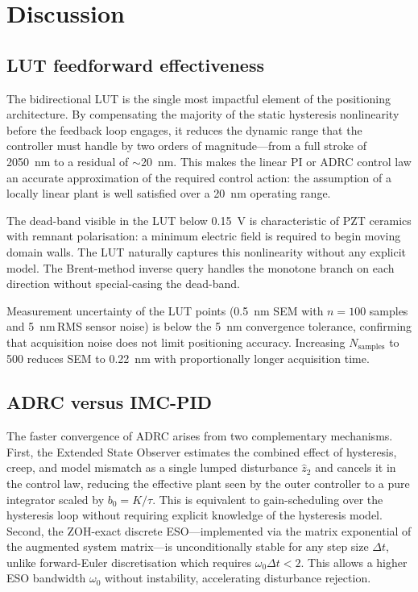 \documentclass[fleqn,10pt]{wlscirep}
\begin{document}
\section*{Discussion}

\subsection*{LUT feedforward effectiveness}

The bidirectional LUT is the single most impactful element of the positioning architecture. By compensating the majority of the static hysteresis nonlinearity before the feedback loop engages, it reduces the dynamic range that the controller must handle by two orders of magnitude---from a full stroke of \SI{2050}{nm} to a residual of $\sim$\SI{20}{nm}. This makes the linear PI or ADRC control law an accurate approximation of the required control action: the assumption of a locally linear plant is well satisfied over a \SI{20}{nm} operating range.

The dead-band visible in the LUT below \SI{0.15}{V} is characteristic of PZT ceramics with remnant polarisation: a minimum electric field is required to begin moving domain walls. The LUT naturally captures this nonlinearity without any explicit model. The Brent-method inverse query handles the monotone branch on each direction without special-casing the dead-band.

Measurement uncertainty of the LUT points (\SI{0.5}{nm} SEM with $n = 100$ samples and \SI{5}{nm}\,RMS sensor noise) is below the \SI{5}{nm} convergence tolerance, confirming that acquisition noise does not limit positioning accuracy. Increasing $N_{\text{samples}}$ to 500 reduces SEM to \SI{0.22}{nm} with proportionally longer acquisition time.

\subsection*{ADRC versus IMC-PID}

The faster convergence of ADRC arises from two complementary mechanisms. First, the Extended State Observer estimates the combined effect of hysteresis, creep, and model mismatch as a single lumped disturbance $\hat{z}_2$ and cancels it in the control law, reducing the effective plant seen by the outer controller to a pure integrator scaled by $b_0 = K/\tau$. This is equivalent to gain-scheduling over the hysteresis loop without requiring explicit knowledge of the hysteresis model. Second, the ZOH-exact discrete ESO---implemented via the matrix exponential of the augmented system matrix---is unconditionally stable for any step size $\Delta t$, unlike forward-Euler discretisation which requires $\omega_0 \Delta t < 2$. This allows a higher ESO bandwidth $\omega_0$ without instability, accelerating disturbance rejection.
\end{document}
